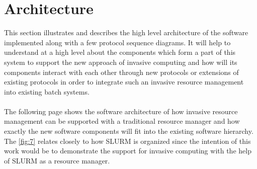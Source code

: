 \chapter{Architecture}
\label{chapter:dynamic resource}
This section illustrates and describes the high level architecture of the software implemented along with a few protocol sequence diagrams. It will help to understand at a high level about the components which form a part of this system to support the new approach of invasive computing and how will its components interact with each other through new protocols or extensions of existing protocols in order to integrate such an invasive resource management into existing batch systems.\\ \\
The following page shows the software architecture of how invasive resource management can be supported with a traditional resource manager and how exactly the new software components will fit into the existing software hierarchy. The \ref{fig:7} relates closely to how SLURM is organized since the intention of this work would be to demonstrate the support for invasive computing with the help of SLURM as a resource manager.

